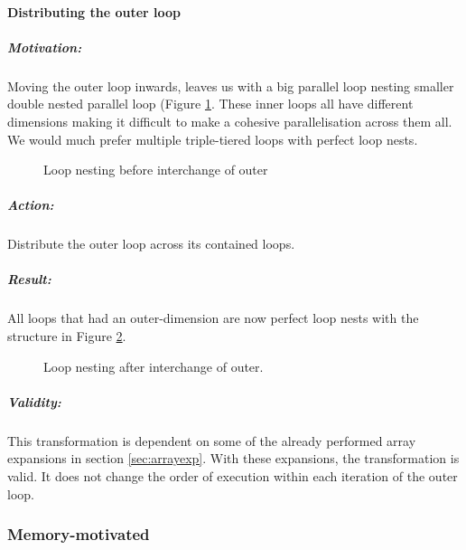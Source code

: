 \paragraph{Distributing the outer loop}
\subparagraph{Motivation:} Moving the outer loop inwards, leaves us with a big parallel loop nesting smaller double nested parallel loop
 (Figure \ref{fig:bintouter}.
 These inner loops all have different dimensions making it difficult to make a cohesive parallelisation across them all. We would much
 prefer multiple triple-tiered loops with perfect loop nests.\\
 \begin{figure}[h!]
   \centering
{}
   \caption{Loop nesting before interchange of outer}
   \label{fig:bintouter}
 \end{figure}
\subparagraph{Action:} Distribute the outer loop across its contained loops.
\subparagraph{Result:} All loops that had an outer-dimension are now perfect loop nests with the structure in Figure \ref{fig:aintouter}.
\begin{figure}[h!]
  \centering
{}
  \caption{Loop nesting after interchange of outer.}
  \label{fig:aintouter}
\end{figure}
\subparagraph{Validity:} This transformation is dependent on some of the already performed array expansions in section \ref{sec:arrayexp}.
 With these expansions, the transformation is valid. It does not change the order of execution within each iteration of the outer loop.
\subsubsection{Memory-motivated}
\label{memory}
